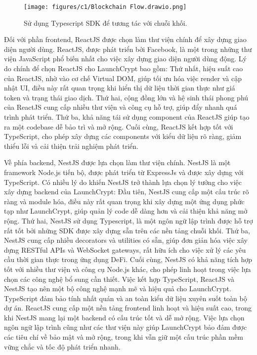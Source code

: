 \begin{figure}[H]
    \begin{center}
        \texttt{[image: figures/c1/Blockchain
            Flow.drawio.png]}
        \caption{Sử dụng Typescript SDK để tương tác với chuỗi khối.}
        \label{fig:feature_interaction_example}
    \end{center}
\end{figure}

Đối với phần frontend, ReactJS được chọn làm thư viện chính để xây dựng giao
diện người dùng. ReactJS, được phát triển bởi Facebook, là một trong những thư
viện JavaScript phổ biến nhất cho việc xây dựng giao diện người dùng động. Lý
do chính để chọn ReactJS cho LaunchCrypt bao gồm: Thứ nhất, hiệu suất cao của
ReactJS, nhờ vào cơ chế Virtual DOM, giúp tối ưu hóa việc render và cập nhật
UI, điều này rất quan trọng khi hiển thị dữ liệu thời gian thực như giá token
và trạng thái giao dịch. Thứ hai, cộng đồng lớn và hệ sinh thái phong phú của
ReactJS cung cấp nhiều thư viện và công cụ hỗ trợ, giúp đẩy nhanh quá trình
phát triển. Thứ ba, khả năng tái sử dụng component của ReactJS giúp tạo ra một
codebase dễ bảo trì và mở rộng. Cuối cùng, ReactJS kết hợp tốt với TypeScript,
cho phép xây dựng các components với kiểu dữ liệu rõ ràng, giảm thiểu lỗi và
cải thiện trải nghiệm phát triển.

Về phía backend, NestJS được lựa chọn làm thư viện chính. NestJS là một
framework Node.js tiến bộ, được phát triển từ ExpressJs và được xây dựng với
TypeScript. Có nhiều lý do khiến NestJS trở thành lựa chọn lý tưởng cho việc
xây dựng backend của LaunchCrypt: Đầu tiên, NestJS cung cấp một cấu trúc rõ
ràng và module hóa, điều này rất quan trọng khi xây dựng một ứng dụng phức tạp
như LaunchCrypt, giúp quản lý code dễ dàng hơn và cải thiện khả năng mở rộng.
Thứ hai, NestJS sử dụng Typescript, là một ngôn ngữ lập trình được hỗ trợ rất
tốt bởi những SDK được xây dựng sẵn trên các nền tảng chuỗi khối. Thứ ba,
NestJS cung
cấp nhiều decorators và utilities có sẵn, giúp đơn giản hóa việc xây dựng
RESTful APIs và WebSocket gateways, rất hữu ích cho việc xử lý các yêu cầu thời
gian thực trong ứng dụng DeFi. Cuối cùng, NestJS có khả năng tích hợp tốt với
nhiều thư viện và công cụ Node.js khác, cho phép linh hoạt trong việc lựa chọn
các công nghệ bổ sung cần thiết.
Việc kết hợp TypeScript, ReactJS và NestJS tạo nên một bộ công nghệ mạnh mẽ và
hiệu quả cho LaunchCrypt. TypeScript đảm bảo tính nhất quán và an toàn kiểu dữ
liệu xuyên suốt toàn bộ dự án. ReactJS cung cấp một nền tảng frontend linh hoạt
và hiệu suất cao, trong khi NestJS mang lại một backend có cấu trúc tốt và dễ
mở rộng. Việc lựa chọn ngôn ngữ lập trình cũng như các thư viện này giúp
LaunchCrypt bảo đảm được các tiêu chí về bảo mật và mở rộng, trong khi vẫn giữ
một cấu trúc phần mềm vững chắc và tốc độ phát triển nhanh.

